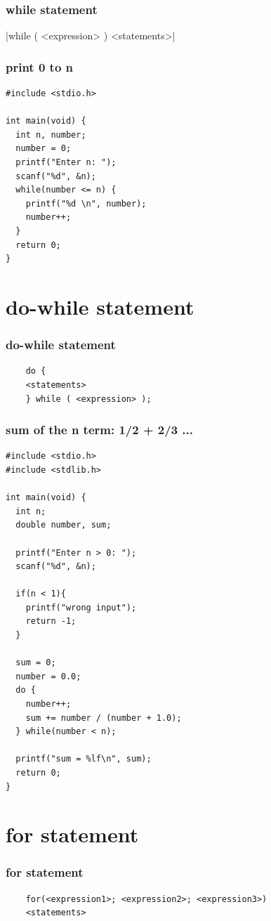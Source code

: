 \documentclass{../c-lecture}
\begin{document}
\begin{frame}
  \frametitle{while statement}
  |while ( <expression> ) <statements>|
\end{frame}

\begin{frame}[fragile]
  \frametitle{print 0 to n}
  \begin{verbatim}
#include <stdio.h>

int main(void) {
  int n, number;
  number = 0;
  printf("Enter n: ");
  scanf("%d", &n);
  while(number <= n) {
    printf("%d \n", number);
    number++;
  }
  return 0;
}
  \end{verbatim}
\end{frame}

\section{do-while statement}

\begin{frame}[fragile]
  \frametitle{do-while statement}
  \begin{verbatim}
    do {
    <statements>
    } while ( <expression> );
  \end{verbatim}
\end{frame}

\begin{frame}[fragile]
  \frametitle{sum of the n term: 1/2 + 2/3 ...}
  \begin{verbatim}
#include <stdio.h>
#include <stdlib.h>

int main(void) {
  int n;
  double number, sum;

  printf("Enter n > 0: ");
  scanf("%d", &n);

  if(n < 1){
    printf("wrong input");
    return -1;
  }

  sum = 0;
  number = 0.0;
  do {
    number++;
    sum += number / (number + 1.0);
  } while(number < n);

  printf("sum = %lf\n", sum);
  return 0;
}
  \end{verbatim}
\end{frame}

\section{for statement}

\begin{frame}[fragile]
  \frametitle{for statement}
  \begin{verbatim}
    for(<expression1>; <expression2>; <expression3>)
    <statements>
  \end{verbatim}
\end{frame}
\end{document}
